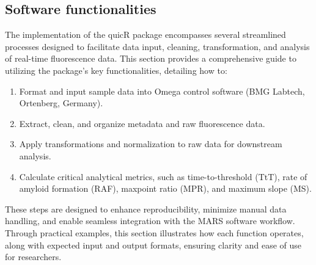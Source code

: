 \documentclass[preprint,12pt, a4paper]{elsarticle}
\begin{document}
\subsection{Software functionalities}
    The implementation of the quicR package encompasses several streamlined processes designed to facilitate data input, cleaning, transformation, and analysis of real-time fluorescence data. This section provides a comprehensive guide to utilizing the package's key functionalities, detailing how to:

    \begin{enumerate}
        \item Format and input sample data into Omega control software (BMG Labtech, Ortenberg, Germany).
        \item Extract, clean, and organize metadata and raw fluorescence data.
        \item Apply transformations and normalization to raw data for downstream analysis.
        \item Calculate critical analytical metrics, such as time-to-threshold (TtT), rate of amyloid formation (RAF), maxpoint ratio (MPR), and maximum slope (MS).
    \end{enumerate}

    These steps are designed to enhance reproducibility, minimize manual data handling, and enable seamless integration with the MARS software workflow. Through practical examples, this section illustrates how each function operates, along with expected input and output formats, ensuring clarity and ease of use for researchers.
\end{document}
